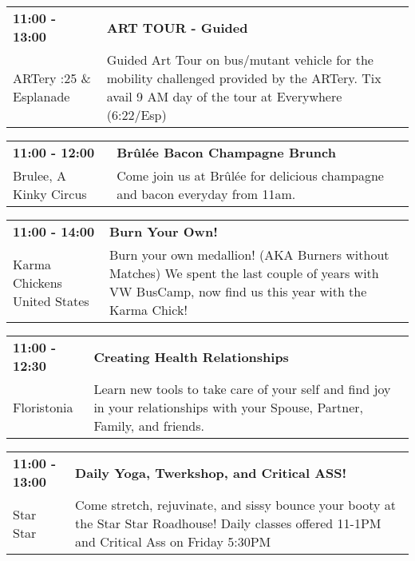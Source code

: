\begin{tabular}{ p{1in} p{2.2in} }
    \textbf{11:00 - 13:00} & \textbf{ART TOUR - Guided} \\
    ARTery \newline 6:25 \& Esplanade & Guided Art Tour on bus/mutant vehicle for the mobility challenged provided by the ARTery.  Tix avail 9 AM  day of the tour at Everywhere (6:22/Esp) \\
    \hline 
\end{tabular}
    
\begin{tabular}{ p{1in} p{2.2in} }
    \textbf{11:00 - 12:00} & \textbf{Br\^ul\'ee Bacon Champagne Brunch} \\
    Brulee, A Kinky Circus \newline  & Come join us at Br\^ul\'ee for delicious champagne and bacon everyday from 11am. \\
    \hline 
\end{tabular}
    
\begin{tabular}{ p{1in} p{2.2in} }
    \textbf{11:00 - 14:00} & \textbf{Burn Your Own!} \\
    Karma Chickens \newline United States & Burn your own medallion! (AKA Burners without Matches) We spent the last couple of years with VW BusCamp, now find us this year with the Karma Chick! \\
    \hline 
\end{tabular}
    
\begin{tabular}{ p{1in} p{2.2in} }
    \textbf{11:00 - 12:30} & \textbf{ Creating Health Relationships} \\
    Floristonia \newline  & Learn new tools to take care of your self and find joy in your relationships with your Spouse, Partner, Family, and friends. \\
    \hline 
\end{tabular}
    
\begin{tabular}{ p{1in} p{2.2in} }
    \textbf{11:00 - 13:00} & \textbf{Daily Yoga, Twerkshop, and Critical ASS!} \\
    Star Star \newline  & Come stretch, rejuvinate, and sissy bounce your booty at the Star Star Roadhouse! Daily classes offered 11-1PM and Critical Ass on Friday 5:30PM \\
    \hline 
\end{tabular}
    
